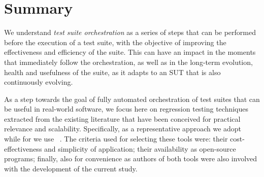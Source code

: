 \section{Summary}\label{sec:orch_summary}


 

We understand \textit{test suite orchestration} as a series of steps that can be performed before the execution of a test suite, with the objective of improving the effectiveness and efficiency of the suite.
This can have an impact in the moments that immediately follow the orchestration, as well as in the long-term evolution, health and usefulness of the suite, as it adapts to an SUT that is also continuously evolving.

As a step towards the goal of fully automated orchestration of test suites that can be useful in real-world software, 
we focus here on regression testing techniques extracted from the existing literature that have been conceived for practical relevance and scalability.
Specifically, as a representative \tcs approach we adopt \ek~\cite{gligoricEk} while for \tcp we use \fs~\cite{miranda_fast}.
The criteria used for selecting these tools were: their cost-effectiveness and simplicity of application; their availability as open-source programs; finally, also for convenience as authors of both tools were also involved with the development of the current study.

